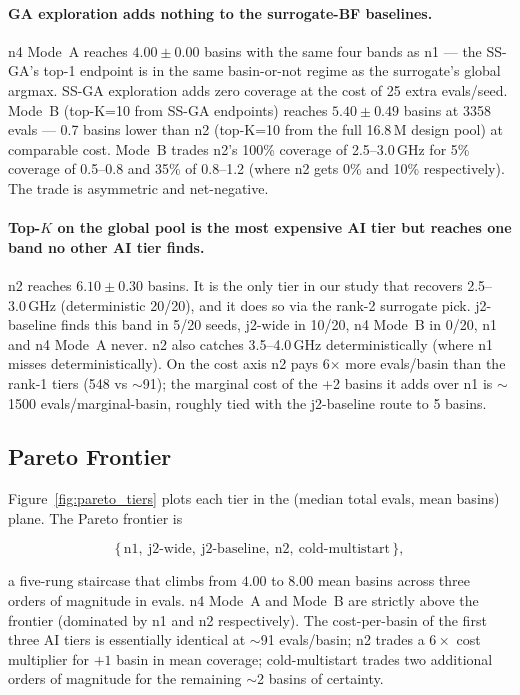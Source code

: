 \paragraph{GA exploration adds nothing to the surrogate-BF baselines.}
n4 Mode~A reaches $4.00 \pm 0.00$ basins with the same four bands as
n1 --- the SS-GA's top-1 endpoint is in the same basin-or-not regime
as the surrogate's global argmax. SS-GA exploration adds zero coverage
at the cost of 25 extra evals/seed. Mode~B (top-K=10 from SS-GA
endpoints) reaches $5.40 \pm 0.49$ basins at 3358 evals --- 0.7 basins
lower than n2 (top-K=10 from the full 16.8\,M design pool) at
comparable cost. Mode~B trades n2's 100\% coverage of 2.5--3.0\,GHz
for 5\% coverage of 0.5--0.8 and 35\% of 0.8--1.2 (where n2 gets 0\%
and 10\% respectively). The trade is asymmetric and net-negative.

\paragraph{Top-$K$ on the global pool is the most expensive AI tier
but reaches one band no other AI tier finds.}
n2 reaches $6.10 \pm 0.30$ basins. It is the only tier in our study
that recovers 2.5--3.0\,GHz (deterministic 20/20), and it does so via
the rank-2 surrogate pick. j2-baseline finds this band in 5/20 seeds,
j2-wide in 10/20, n4 Mode~B in 0/20, n1 and n4 Mode~A never. n2 also
catches 3.5--4.0\,GHz deterministically (where n1 misses
deterministically). On the cost axis n2 pays 6$\times$ more
evals/basin than the rank-1 tiers (548 vs $\sim$91); the marginal cost
of the +2 basins it adds over n1 is $\sim$1500 evals/marginal-basin,
roughly tied with the j2-baseline route to 5 basins.

\subsection{Pareto Frontier}

Figure~\ref{fig:pareto_tiers} plots each tier in the
(median total evals, mean basins) plane. The Pareto frontier is

\[
\{\,\textrm{n1},\ \textrm{j2-wide},\ \textrm{j2-baseline},\
   \textrm{n2},\ \textrm{cold-multistart}\,\},
\]

a five-rung staircase that climbs from $4.00$ to $8.00$ mean basins
across three orders of magnitude in evals. n4 Mode~A and Mode~B are
strictly above the frontier (dominated by n1 and n2 respectively).
The cost-per-basin of the first three AI tiers is essentially
identical at $\sim$91 evals/basin; n2 trades a $6\times$ cost
multiplier for $+1$ basin in mean coverage; cold-multistart trades
two additional orders of magnitude for the remaining $\sim$2 basins
of certainty.

